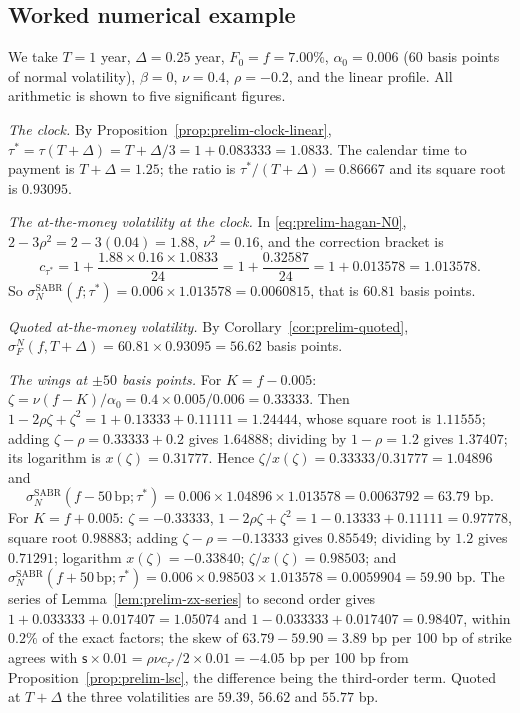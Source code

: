\documentclass[../../../main.tex]{subfiles}
\begin{document}

\subsection{Worked numerical example}\label{subsec:prelim-worked}

We take $T=1$ year, $\Delta=0.25$ year, $F_0=f=7.00\%$, $\alpha_0=0.006$ (60 basis points of normal volatility), $\beta=0$, $\nu=0.4$, $\rho=-0.2$, and the linear profile. All arithmetic is shown to five significant figures.

\emph{The clock.} By Proposition~\ref{prop:prelim-clock-linear}, $\tau^*=\tau(T+\Delta)=T+\Delta/3=1+0.083333=1.0833$. The calendar time to payment is $T+\Delta=1.25$; the ratio is $\tau^*/(T+\Delta)=0.86667$ and its square root is $0.93095$.

\emph{The at-the-money volatility at the clock.} In \eqref{eq:prelim-hagan-N0}, $2-3\rho^2=2-3(0.04)=1.88$, $\nu^2=0.16$, and the correction bracket is
\[
c_{\tau^*}=1+\frac{1.88\times0.16\times1.0833}{24}=1+\frac{0.32587}{24}=1+0.013578=1.013578 .
\]
So $\sigma_N^{\mathrm{SABR}}(f;\tau^*)=0.006\times1.013578=0.0060815$, that is $60.81$ basis points.

\emph{Quoted at-the-money volatility.} By Corollary~\ref{cor:prelim-quoted}, $\sigma^N_F(f,T+\Delta)=60.81\times0.93095=56.62$ basis points.

\emph{The wings at $\pm50$ basis points.} For $K=f-0.005$: $\zeta=\nu(f-K)/\alpha_0=0.4\times0.005/0.006=0.33333$. Then $1-2\rho\zeta+\zeta^2=1+0.13333+0.11111=1.24444$, whose square root is $1.11555$; adding $\zeta-\rho=0.33333+0.2$ gives $1.64888$; dividing by $1-\rho=1.2$ gives $1.37407$; its logarithm is $x(\zeta)=0.31777$. Hence $\zeta/x(\zeta)=0.33333/0.31777=1.04896$ and
\[
\sigma_N^{\mathrm{SABR}}(f-50\,\mathrm{bp};\tau^*)=0.006\times1.04896\times1.013578=0.0063792=63.79\text{ bp}.
\]
For $K=f+0.005$: $\zeta=-0.33333$, $1-2\rho\zeta+\zeta^2=1-0.13333+0.11111=0.97778$, square root $0.98883$; adding $\zeta-\rho=-0.13333$ gives $0.85549$; dividing by $1.2$ gives $0.71291$; logarithm $x(\zeta)=-0.33840$; $\zeta/x(\zeta)=0.98503$; and $\sigma_N^{\mathrm{SABR}}(f+50\,\mathrm{bp};\tau^*)=0.006\times0.98503\times1.013578=0.0059904=59.90$ bp. The series of Lemma~\ref{lem:prelim-zx-series} to second order gives $1+0.033333+0.017407=1.05074$ and $1-0.033333+0.017407=0.98407$, within $0.2\%$ of the exact factors; the skew of $63.79-59.90=3.89$ bp per 100 bp of strike agrees with $\mathsf s\times0.01=\rho\nu c_{\tau^*}/2\times0.01=-4.05$ bp per 100 bp from Proposition~\ref{prop:prelim-lsc}, the difference being the third-order term. Quoted at $T+\Delta$ the three volatilities are $59.39$, $56.62$ and $55.77$ bp.
\end{document}

